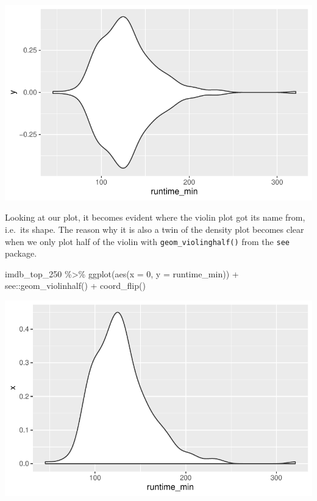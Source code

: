 \documentclass[
  letterpaper,
]{krantz}
\makeatletter
\newenvironment{Shaded}{\begin{snugshade}}{\end{snugshade}}
\newcommand{\AttributeTok}[1]{\textcolor[rgb]{0.40,0.45,0.13}{#1}}
\newcommand{\DecValTok}[1]{\textcolor[rgb]{0.68,0.00,0.00}{#1}}
\newcommand{\FunctionTok}[1]{\textcolor[rgb]{0.28,0.35,0.67}{#1}}
\newcommand{\NormalTok}[1]{\textcolor[rgb]{0.00,0.23,0.31}{#1}}
\newcommand{\SpecialCharTok}[1]{\textcolor[rgb]{0.37,0.37,0.37}{#1}}
\newenvironment{kframe}{%
\medskip{}
\setlength{\fboxsep}{.8em}
 \def\at@end@of@kframe{}%
 \ifinner\ifhmode%
  \def\at@end@of@kframe{\end{minipage}}%
  \begin{minipage}{\columnwidth}%
 \fi\fi%
 \def\FrameCommand##1{\hskip\@totalleftmargin \hskip-\fboxsep
 \colorbox{shadecolor}{##1}\hskip-\fboxsep
     \hskip-\linewidth \hskip-\@totalleftmargin \hskip\columnwidth}%
 \MakeFramed {\advance\hsize-\width
   \@totalleftmargin\z@ \linewidth\hsize
   \@setminipage}}%
 {\par\unskip\endMakeFramed%
 \at@end@of@kframe}
\renewenvironment{Shaded}{\begin{kframe}}{\end{kframe}}
\makeatother
\begin{document}
\includegraphics{08_descriptive_statistics_files/figure-pdf/violin-plot-1.pdf}

Looking at our plot, it becomes evident where the violin plot got its
name from, i.e.~its shape. The reason why it is also a twin of the
density plot becomes clear when we only plot half of the violin with
\texttt{geom\_violinghalf()} from the \texttt{see} package.

\begin{Shaded}
\begin{Highlighting}[]
\NormalTok{imdb\_top\_250 }\SpecialCharTok{\%\textgreater{}\%}
  \FunctionTok{ggplot}\NormalTok{(}\FunctionTok{aes}\NormalTok{(}\AttributeTok{x =} \DecValTok{0}\NormalTok{, }\AttributeTok{y =}\NormalTok{ runtime\_min)) }\SpecialCharTok{+}
\NormalTok{  see}\SpecialCharTok{::}\FunctionTok{geom\_violinhalf}\NormalTok{() }\SpecialCharTok{+}
  \FunctionTok{coord\_flip}\NormalTok{()}
\end{Highlighting}
\end{Shaded}

\includegraphics{08_descriptive_statistics_files/figure-pdf/half-violin-plot-1.pdf}
\end{document}
